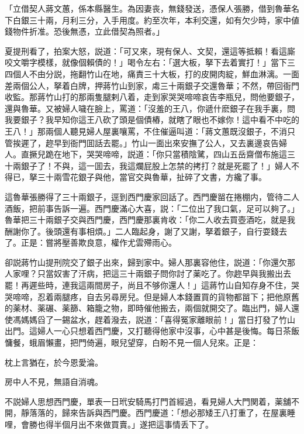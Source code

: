 \begin{myquote}[\markfont]
「立借契人蔣文蕙，係本縣醫生。為因妻丧，無錢發送，憑保人張勝，借到魯華名下白銀三十兩，月利三分，入手用度。約至次年，本利交還，如有欠少時，家中値錢物件折准。恐後無憑，立此借契為照者。」
\end{myquote}

夏提刑看了，拍案大怒，説道：「可又來，現有保人、文契，還這等抵賴！看這廝咬文嚼字模樣，就像個賴債的！」喝令左右：「選大板，拏下去着實打！」當下三四個人不由分説，拖翻竹山在地，痛責三十大板，打的皮開肉綻，鮮血淋漓。一面差兩個公人，拏着白牌，押蔣竹山到家，䖏三十兩銀子交還魯華；不然，帶回衙門收監。那蔣竹山打的那兩隻腿剌八着，走到家哭哭啼啼哀告李瓶兒，問他要銀子，還與魯華。又被婦人噦在臉上，罵道：「沒羞的王八，你遞什麽銀子在我手裏，問我要銀子？我早知你這王八砍了頭是個債樁，就瞎了眼也不嫁你！這中看不中吃的王八！」那兩個人聽見婦人屋裏嚷罵，不住催逼叫道：「蔣文蕙既沒銀子，不消只管挨遲了，趂早到衙門囬話去罷。」竹山一面出來安撫了公人，又去裏邊哀告婦人。直撅兒跪在地下，哭哭啼啼，説道：「你只當積陰騭，四山五岳齋僧布施這三十兩銀子了！不與，這一囬去，我這爛屁股上怎禁的拷打？就是死罷了！」婦人不得已，拏三十兩雪花銀子與他，當官交與魯華，扯碎了文書，方纔了事。

這魯華張勝得了三十兩銀子，逕到西門慶家回話了。西門慶㽞在捲棚内，管待二人酒飯，把前事告訴一遍。西門慶滿心大喜，説：「二位出了我口氣，足可以夠了。」魯華把三十兩銀子交與西門慶，西門慶那裏肯收：「你二人收去買壺酒吃，就是我酬謝你了。後頭還有事相煩。」二人臨起身，謝了又謝，拏着銀子，自行耍錢去了。正是：嘗將壓善欺良意，權作尤雲殢雨心。

卻説蔣竹山提刑院交了銀子出來，歸到家中。婦人那裏容他住，説道：「你還欠那人家哩？只當奴害了汗病，把這三十兩銀子問你討了薬吃了。你趂早與我搬出去罷！再遲些時，連我這兩間房子，尚且不够你還人！」這蔣竹山自知存身不住，哭哭啼啼，忍着兩腿疼，自去另尋房兒。但是婦人本錢置買的貨物都㽞下；把他原舊的薬材、薬碾、薬篩、箱籠之物，即時催他搬去，兩個就開交了。臨出門，婦人還使馮媽媽舀了一錫盆水，趕着潑去，説道：「喜得冤家離眼前！」當日打發了竹山出門。這婦人一心只想着西門慶，又打聽得他家中沒事，心中甚是後悔。每日茶飯慵餐，蛾眉懶畫，把門倚遍，眼兒望穿，白盼不見一個人兒來。正是：

\begin{myquote}
枕上言猶在，於今恩愛淪。

房中人不見，無語自消魂。
\end{myquote}

不説婦人思想西門慶，單表一日玳安騎馬打門首經過，看見婦人大門関着，薬舖不開，靜落落的，歸來告訴與西門慶。西門慶道：「想必那矮王八打重了，在屋裏睡哩，會勝也得半個月出不來做買賣。」遂把這事情丢下了。

